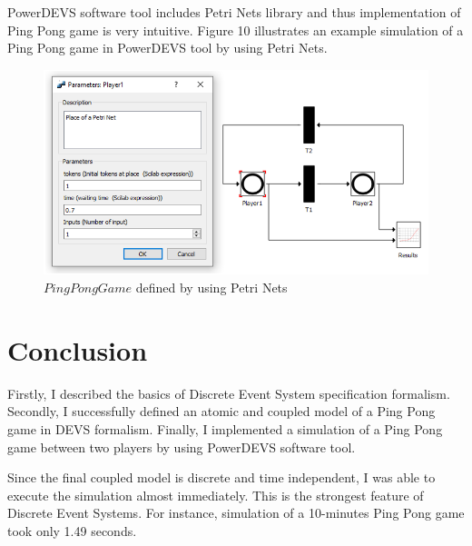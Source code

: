 \documentclass[fleqn,10pt]{olplainarticle}
\begin{document}
PowerDEVS software tool includes Petri Nets library and thus implementation of Ping Pong game is very intuitive. Figure 10 illustrates an example simulation of a Ping Pong game in PowerDEVS tool by using Petri Nets.

\begin{figure}[ht]
    \centering
    \includegraphics[width=1.0\linewidth]{images/9-ping-pong-petri.png}
    \caption{$PingPongGame$ defined by using Petri Nets}
    \label{fig:figure6}
\end{figure}

\section{Conclusion}

Firstly, I described the basics of Discrete Event System specification formalism. Secondly, I successfully defined an atomic and coupled model of a Ping Pong game in DEVS formalism. Finally, I implemented a simulation of a Ping Pong game between two players by using PowerDEVS software tool.

\vskip10pt

Since the final coupled model is discrete and time independent, I was able to execute the simulation almost immediately. This is the strongest feature of Discrete Event Systems. For instance, simulation of a 10-minutes Ping Pong game took only 1.49 seconds.


\pagebreak


\end{document}

